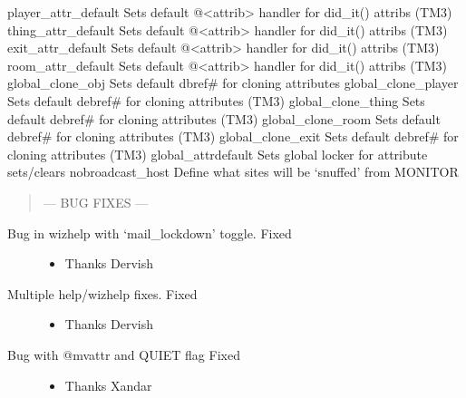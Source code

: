 \documentclass[letterpaper,10pt,english]{sphinxmanual}
\begin{document}
\sphinxAtStartPar
player\_attr\_default \sphinxhyphen{} Sets default @\textless{}attrib\textgreater{} handler for did\_it() attribs (TM3)
thing\_attr\_default \sphinxhyphen{} Sets default @\textless{}attrib\textgreater{} handler for did\_it() attribs (TM3)
exit\_attr\_default \sphinxhyphen{} Sets default @\textless{}attrib\textgreater{} handler for did\_it() attribs (TM3)
room\_attr\_default \sphinxhyphen{} Sets default @\textless{}attrib\textgreater{} handler for did\_it() attribs (TM3)
global\_clone\_obj \sphinxhyphen{} Sets default dbref\# for cloning attributes
global\_clone\_player \sphinxhyphen{} Sets default debref\# for cloning attributes (TM3)
global\_clone\_thing \sphinxhyphen{} Sets default debref\# for cloning attributes (TM3)
global\_clone\_room \sphinxhyphen{} Sets default debref\# for cloning attributes (TM3)
global\_clone\_exit \sphinxhyphen{} Sets default debref\# for cloning attributes (TM3)
global\_attrdefault \sphinxhyphen{} Sets global locker for attribute sets/clears
nobroadcast\_host \sphinxhyphen{} Define what sites will be ‘snuffed’ from MONITOR
\begin{quote}

\sphinxAtStartPar
— BUG FIXES —
\end{quote}
\begin{description}
\item[{Bug in wizhelp with ‘mail\_lockdown’ toggle.  \sphinxhyphen{} Fixed}] \leavevmode\begin{itemize}
\item {} 
\sphinxAtStartPar
Thanks Dervish

\end{itemize}

\item[{Multiple help/wizhelp fixes.  \sphinxhyphen{} Fixed}] \leavevmode\begin{itemize}
\item {} 
\sphinxAtStartPar
Thanks Dervish

\end{itemize}

\item[{Bug with @mvattr and QUIET flag \sphinxhyphen{} Fixed}] \leavevmode\begin{itemize}
\item {} 
\sphinxAtStartPar
Thanks Xandar

\end{itemize}

\end{description}
\end{document}
